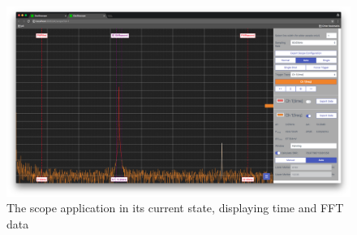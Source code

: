 \begin{figure}
    \centering
    \includegraphics[width=1\textwidth]{images/gui/scope}
    \caption[The Scope Application]{%
        The scope application in its current state, displaying time and FFT data%
    }
    \label{fig:usegruide:screenshot}
\end{figure}


